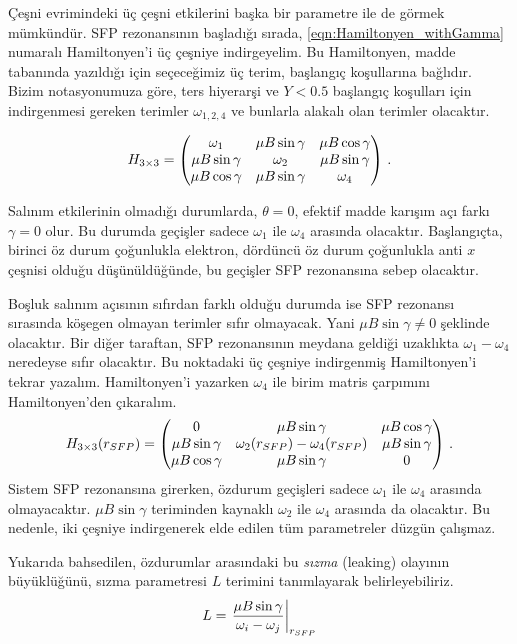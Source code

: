 Çeşni evrimindeki üç çeşni etkilerini başka bir parametre ile de görmek mümkündür. SFP rezonansının başladığı sırada, \eqref{eqn:Hamiltonyen_withGamma} numaralı Hamiltonyen'i üç çeşniye indirgeyelim. Bu Hamiltonyen, madde tabanında yazıldığı için seçeceğimiz üç terim, başlangıç koşullarına bağlıdır. Bizim notasyonumuza göre, ters hiyerarşi ve $ Y<0.5 $ başlangıç koşulları için indirgenmesi gereken terimler $ \omega_{1,2,4} $ ve bunlarla alakalı olan terimler olacaktır.

\begin{equation}
    H_{3\times3} = \mqty(\omega_{1} & \mu B \sin\gamma & \mu B \cos \gamma \\ \mu B \sin\gamma & \omega_{2} & \mu B \sin \gamma \\ \mu B \cos \gamma & \mu B \sin\gamma & \omega_{4}) \text{ .}
\end{equation}

Salınım etkilerinin olmadığı durumlarda, $ \theta=0 $, efektif madde karışım açı farkı $ \gamma=0 $ olur. Bu durumda geçişler sadece $ \omega_{1} $ ile $ \omega_{4} $ arasında olacaktır. Başlangıçta, birinci öz durum çoğunlukla elektron, dördüncü öz durum çoğunlukla anti $x$ çeşnisi olduğu düşünüldüğünde, bu geçişler SFP rezonansına sebep olacaktır.

Boşluk salınım açısının sıfırdan farklı olduğu durumda ise SFP rezonansı sırasında köşegen olmayan terimler sıfır olmayacak. Yani $ \mu B \sin \gamma \ne 0 $ şeklinde olacaktır. Bir diğer taraftan, SFP rezonansının meydana geldiği uzaklıkta $ \omega_{1}-\omega_{4} $ neredeyse sıfır olacaktır. Bu noktadaki üç çeşniye indirgenmiş Hamiltonyen'i tekrar yazalım. Hamiltonyen'i yazarken $ \omega_{4} $ ile birim matris çarpımını Hamiltonyen'den çıkaralım. 
\begin{equation}
    H_{3\times3}(r_{SFP}) = \mqty(0 & \mu B \sin\gamma & \mu B \cos \gamma \\ \mu B \sin\gamma & \omega_{2}(r_{SFP})-\omega_{4}(r_{SFP}) & \mu B \sin \gamma \\ \mu B \cos \gamma & \mu B \sin\gamma & 0) \text{ .}
\end{equation}
Sistem SFP rezonansına girerken, özdurum geçişleri sadece $ \omega_{1} $ ile $ \omega_{4} $ arasında olmayacaktır. $ \mu B \sin \gamma $ teriminden kaynaklı $ \omega_{2} $ ile $ \omega_{4} $ arasında da olacaktır. Bu nedenle, iki çeşniye indirgenerek elde edilen tüm parametreler düzgün çalışmaz. 

Yukarıda bahsedilen, özdurumlar arasındaki bu \emph{sızma} (leaking) olayının büyüklüğünü, sızma parametresi $ L $ terimini tanımlayarak belirleyebiliriz.
\begin{equation}
    L = \eval{\frac{\mu B \sin \gamma}{\omega_{i}-\omega_{j}}}_{r_{SFP}}
\end{equation}

